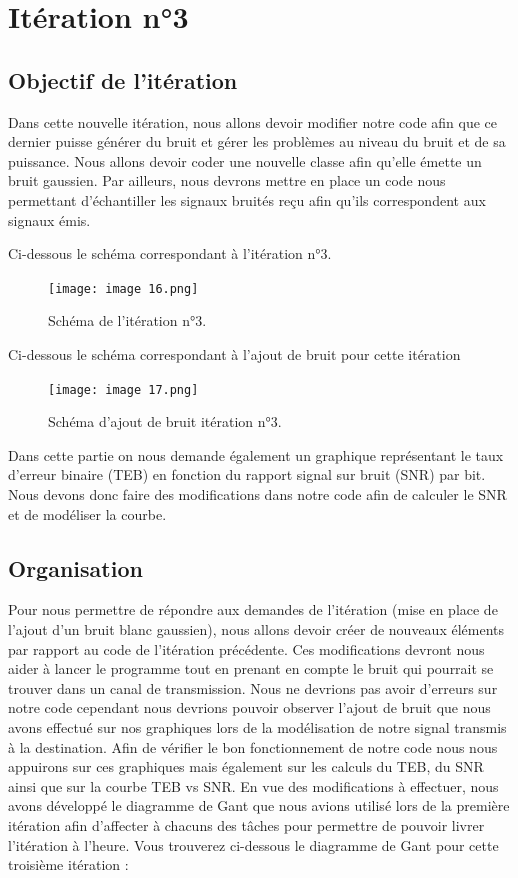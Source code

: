 \section{Itération n°3}

\subsection{Objectif de l'itération}

Dans cette nouvelle itération, nous allons devoir modifier notre code afin que ce dernier puisse générer du bruit et gérer les problèmes au niveau du bruit et de sa puissance. Nous allons devoir coder une nouvelle classe afin qu'elle émette un bruit gaussien. Par ailleurs, nous devrons mettre en place un code nous permettant d'échantiller les signaux bruités reçu afin qu'ils correspondent aux signaux émis.

Ci-dessous le schéma correspondant à l'itération n°3.

\begin{figure}[H]
\centering
\texttt{[image: image 16.png]}
\caption{\label{fig:image16}Schéma de l'itération n°3.}
\end{figure}

Ci-dessous le schéma correspondant à l'ajout de bruit pour cette itération

\begin{figure}[H]
\centering
\texttt{[image: image 17.png]}
\caption{\label{fig:image17}Schéma d'ajout de bruit itération n°3.}
\end{figure}

Dans cette partie on nous demande également un graphique représentant le taux d'erreur binaire (TEB) en fonction du rapport signal sur bruit (SNR) par bit. Nous devons donc faire des modifications dans notre code afin de calculer le SNR et de modéliser la courbe.

\subsection{Organisation}

Pour nous permettre de répondre aux demandes de l'itération (mise en place de l'ajout d'un bruit blanc gaussien), nous allons devoir créer de nouveaux éléments par rapport au code de l'itération précédente. Ces modifications devront nous aider à lancer le programme tout en prenant en compte le bruit qui pourrait se trouver dans un canal de transmission. Nous ne devrions pas avoir d'erreurs sur notre code cependant nous devrions pouvoir observer l'ajout de bruit que nous avons effectué sur nos graphiques lors de la modélisation de notre signal transmis à la destination. Afin de vérifier le bon fonctionnement de notre code nous nous appuirons sur ces graphiques mais également sur les calculs du TEB, du SNR ainsi que sur la courbe TEB vs SNR.
En vue des modifications à effectuer, nous avons développé le diagramme de Gant que nous avions utilisé lors de la première itération afin d'affecter à chacuns des tâches pour permettre de pouvoir livrer l'itération à l'heure. Vous trouverez ci-dessous le diagramme de Gant pour cette troisième itération :

